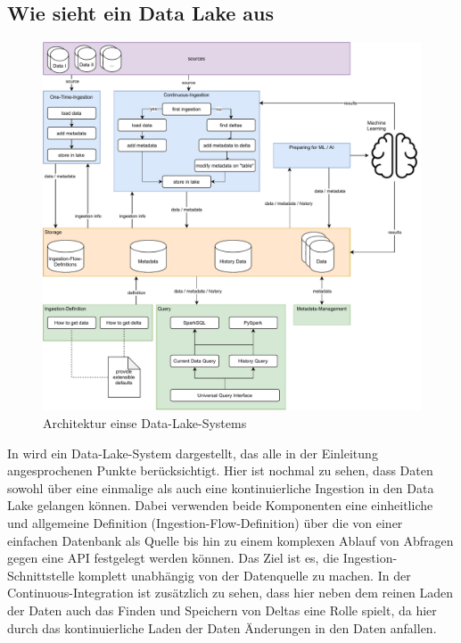 \subsection{Wie sieht ein Data Lake aus}

\begin{figure}
    \begin{center}
        \includegraphics[width=\textwidth]{Grafiken/arch.pdf}
        \caption{Architektur einse Data-Lake-Systems}
        \label{fig:dl-arch}
    \end{center}
\end{figure}
In  wird ein Data-Lake-System dargestellt, das alle in der Einleitung angesprochenen Punkte berücksichtigt.
Hier ist nochmal zu sehen, dass Daten sowohl über eine einmalige als auch eine kontinuierliche Ingestion in den Data Lake gelangen können.
Dabei verwenden beide Komponenten eine einheitliche und allgemeine Definition (Ingestion-Flow-Definition) über die von einer einfachen Datenbank als Quelle bis hin zu einem komplexen Ablauf von Abfragen gegen eine API festgelegt werden können.
Das Ziel ist es, die Ingestion-Schnittstelle komplett unabhängig von der Datenquelle zu machen.
In der Continuous-Integration ist zusätzlich zu sehen, dass hier neben dem reinen Laden der Daten auch das Finden und Speichern von Deltas eine Rolle spielt, da hier durch das kontinuierliche Laden der Daten Änderungen in den Daten anfallen.


